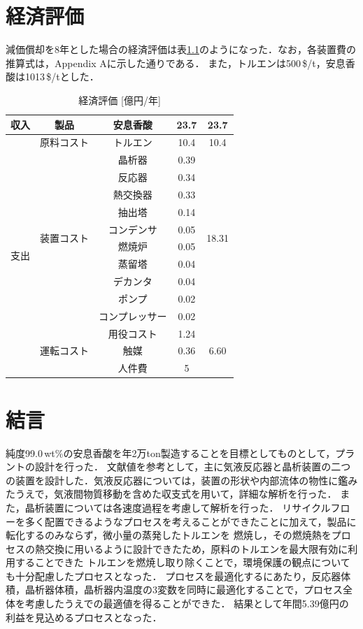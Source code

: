 \documentclass[a4j]{jsreport}
\begin{document}
\chapter{経済評価}
減価償却を8年とした場合の経済評価は表\ref{経済評価}のようになった．なお，各装置費の推算式は，Appendix Aに示した通りである．
また，トルエンは500\,\$/\si{\tonne}，安息香酸は1013\,\$/\si{\tonne}とした．
\begin{table}[htbp]
    \centering
    \caption{経済評価 [億円/年]}
    \label{経済評価}
    \begin{tabular}{c|c|cc|c}
      \hline
      収入 & 製品 & 安息香酸 & 23.7 & 23.7 \\
      \hline
      \multirow{14}{*}{支出} & 原料コスト & トルエン & 10.4 & 10.4 \\
      \cline{2-5}
      & \multirow{10}{*}{装置コスト} & 晶析器 & 0.39 & \multirow{10}{*}{18.31} \\
      & & 反応器 & 0.34 & \\
      & & 熱交換器 & 0.33 & \\
      & & 抽出塔 & 0.14 & \\
      & & コンデンサ & 0.05 & \\
      & & 燃焼炉 & 0.05 & \\
      & & 蒸留塔 & 0.04 & \\
      & & デカンタ & 0.04 & \\
      & & ポンプ & 0.02 & \\
      & & コンプレッサー & 0.02 & \\
      \cline{2-5}
      & \multirow{3}{*}{運転コスト} & 用役コスト & 1.24 & \multirow{3}{*}{6.60} \\
      & & 触媒 & 0.36 & \\
      & & 人件費 & 5 & \\
      \hline
    \end{tabular}
\end{table}


\clearpage
\chapter{結言}
純度99.0\,wt\%の安息香酸を年2万ton製造することを目標としてものとして，プラントの設計を行った．
文献値を参考として，主に気液反応器と晶析装置の二つの装置を設計した．気液反応器については，装置の形状や内部流体の物性に鑑みたうえで，気液間物質移動を含めた収支式を用いて，詳細な解析を行った．
また，晶析装置については各速度過程を考慮して解析を行った．
リサイクルフローを多く配置できるようなプロセスを考えることができたことに加えて，製品に転化するのみならず，微小量の蒸発したトルエンを
燃焼し，その燃焼熱をプロセスの熱交換に用いるように設計できたため，原料のトルエンを最大限有効に利用することできた
トルエンを燃焼し取り除くことで，環境保護の観点についても十分配慮したプロセスとなった．
プロセスを最適化するにあたり，反応器体積，晶析器体積，晶析器内温度の3変数を同時に最適化することで，プロセス全体を考慮したうえでの最適値を得ることができた．
結果として年間5.39億円の利益を見込めるプロセスとなった．
\end{document}
